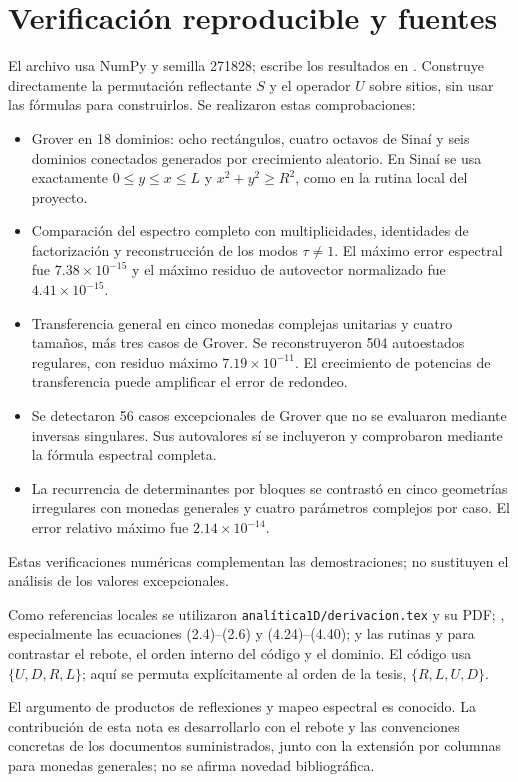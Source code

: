 \documentclass[11pt,a4paper]{article}
\numberwithin{equation}{section}
\begin{document}
\section{Verificación reproducible y fuentes}
El archivo  usa NumPy y semilla 271828; escribe los resultados en . Construye directamente la permutación reflectante $S$ y el operador $U$ sobre sitios, sin usar las fórmulas para construirlos. Se realizaron estas comprobaciones:
\begin{itemize}
 \item Grover en 18 dominios: ocho rectángulos, cuatro octavos de Sinaí y seis dominios conectados generados por crecimiento aleatorio. En Sinaí se usa exactamente $0\le y\le x\le L$ y $x^2+y^2\ge R^2$, como en la rutina local del proyecto.
 \item Comparación del espectro completo con multiplicidades, identidades de factorización y reconstrucción de los modos $\tau\ne1$. El máximo error espectral fue $7.38\times10^{-15}$ y el máximo residuo de autovector normalizado fue $4.41\times10^{-15}$.
 \item Transferencia general en cinco monedas complejas unitarias y cuatro tamaños, más tres casos de Grover. Se reconstruyeron 504 autoestados regulares, con residuo máximo $7.19\times10^{-11}$. El crecimiento de potencias de transferencia puede amplificar el error de redondeo.
 \item Se detectaron 56 casos excepcionales de Grover que no se evaluaron mediante inversas singulares. Sus autovalores sí se incluyeron y comprobaron mediante la fórmula espectral completa.
 \item La recurrencia de determinantes por bloques se contrastó en cinco geometrías irregulares con monedas generales y cuatro parámetros complejos por caso. El error relativo máximo fue $2.14\times10^{-14}$.
\end{itemize}
Estas verificaciones numéricas complementan las demostraciones; no sustituyen el análisis de los valores excepcionales.

Como referencias locales se utilizaron \texttt{analítica1D/derivacion.tex} y su PDF; , especialmente las ecuaciones (2.4)--(2.6) y (4.24)--(4.40); y las rutinas  y  para contrastar el rebote, el orden interno del código y el dominio. El código usa $\{U,D,R,L\}$; aquí se permuta explícitamente al orden de la tesis, $\{R,L,U,D\}$.

El argumento de productos de reflexiones y mapeo espectral es conocido. La contribución de esta nota es desarrollarlo con el rebote y las convenciones concretas de los documentos suministrados, junto con la extensión por columnas para monedas generales; no se afirma novedad bibliográfica.
\end{document}
